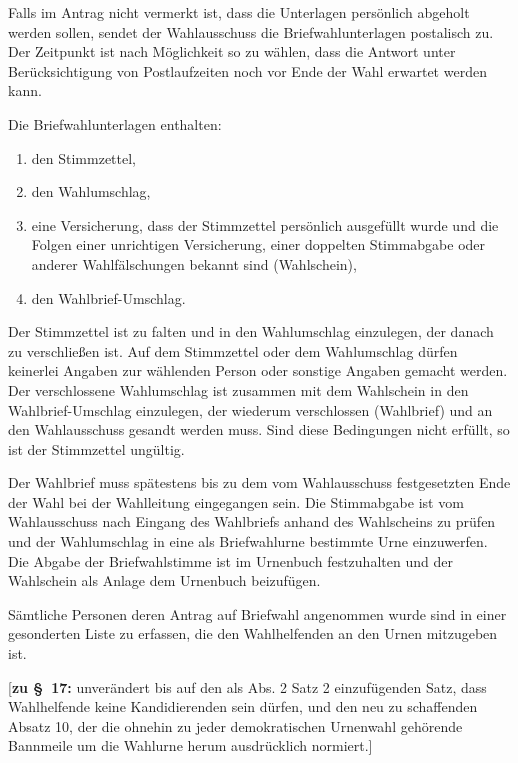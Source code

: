 \documentclass[%
draft,%
multilinesections%
]{fswo}
\newcommand\bemFr[1] {{\color{Red}[#1]}}
\newcommand\bemFr[1]{}%
\begin{document}
\begin{contract}
Falls im Antrag nicht vermerkt ist, dass die Unterlagen persönlich abgeholt werden sollen, sendet der Wahlausschuss die Briefwahlunterlagen postalisch zu.
Der Zeitpunkt ist nach Möglichkeit so zu wählen, dass die Antwort unter Berücksichtigung von Postlaufzeiten noch vor Ende der Wahl erwartet werden kann.

Die Briefwahlunterlagen enthalten:
\begin{enumerate}
\item den Stimmzettel,
\item den Wahlumschlag,
\item eine Versicherung, dass der Stimmzettel persönlich ausgefüllt wurde und die Folgen einer unrichtigen Versicherung, einer doppelten Stimmabgabe oder anderer Wahlfälschungen bekannt sind (Wahlschein),
\item den Wahlbrief-Umschlag.
\end{enumerate}

Der Stimmzettel ist zu falten und in den Wahlumschlag einzulegen, der danach zu verschließen ist.
Auf dem Stimmzettel oder dem Wahlumschlag dürfen keinerlei Angaben zur wählenden Person oder sonstige Angaben gemacht werden.
Der verschlossene Wahlumschlag ist zusammen mit dem Wahlschein in den Wahlbrief-Umschlag einzulegen, der wiederum verschlossen (Wahlbrief) und an den Wahlausschuss gesandt werden muss.
Sind diese Bedingungen nicht erfüllt, so ist der Stimmzettel ungültig.

Der Wahlbrief muss spätestens bis zu dem vom Wahlausschuss festgesetzten Ende der Wahl bei der Wahlleitung eingegangen sein.
Die Stimmabgabe ist vom Wahlausschuss nach Eingang des Wahlbriefs anhand des Wahlscheins zu prüfen und der Wahlumschlag in eine als Briefwahlurne bestimmte Urne einzuwerfen.
Die Abgabe der Briefwahlstimme ist im Urnenbuch festzuhalten und der Wahlschein als Anlage dem Urnenbuch beizufügen.

Sämtliche Personen deren Antrag auf Briefwahl angenommen wurde sind in einer gesonderten Liste zu erfassen, die den Wahlhelfenden an den Urnen mitzugeben ist.
\end{contract}

\bemFr{\textbf{zu \S~17:} unverändert bis auf den als Abs. 2 Satz 2 einzufügenden Satz, dass Wahlhelfende keine Kandidierenden sein dürfen, und den neu zu schaffenden Absatz 10, der die ohnehin zu jeder demokratischen Urnenwahl gehörende Bannmeile um die Wahlurne herum ausdrücklich normiert.}
\end{document}
